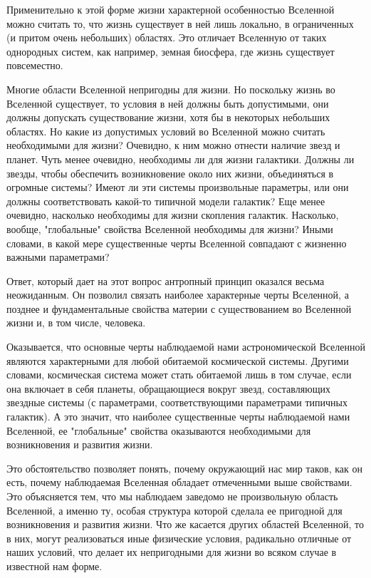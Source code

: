 Применительно к этой форме жизни характерной особенностью Вселенной можно считать то, что жизнь существует в ней лишь локально, в ограниченных (и притом очень небольших) областях. Это отличает Вселенную от таких однородных систем, как например, земная биосфера, где жизнь существует повсеместно.


Многие области Вселенной непригодны для жизни. Но поскольку жизнь во Вселенной существует, то условия в ней должны быть допустимыми, они должны допускать существование жизни, хотя бы в некоторых небольших областях. Но какие из допустимых условий во Вселенной можно считать необходимыми для жизни? Очевидно, к ним можно отнести наличие звезд и планет. Чуть менее очевидно, необходимы ли для жизни галактики. Должны ли звезды, чтобы обеспечить возникновение около них жизни, объединяться в огромные системы? Имеют ли эти системы произвольные параметры, или они должны соответствовать какой-то типичной модели галактик? Еще менее очевидно, насколько необходимы для жизни скопления галактик. Насколько, вообще, "глобальные" свойства Вселенной необходимы для жизни? Иными словами, в какой мере существенные черты Вселенной совпадают с жизненно важными параметрами?


Ответ, который дает на этот вопрос антропный принцип оказался весьма неожиданным. Он позволил связать наиболее характерные черты Вселенной, а позднее и фундаментальные свойства материи с существованием во Вселенной жизни и, в том числе, человека.


Оказывается, что основные черты наблюдаемой нами астрономической Вселенной являются характерными для любой обитаемой космической системы. Другими словами, космическая система может стать обитаемой лишь в том случае, если она включает в себя планеты, обращающиеся вокруг звезд, составляющих звездные системы (с параметрами, соответствующими параметрами типичных галактик). А это значит, что наиболее существенные черты наблюдаемой нами Вселенной, ее "глобальные" свойства оказываются необходимыми для возникновения и развития жизни.


Это обстоятельство позволяет понять, почему окружающий нас мир таков, как он есть, почему наблюдаемая Вселенная обладает отмеченными выше свойствами. Это объясняется тем, что мы наблюдаем заведомо не произвольную область Вселенной, а именно ту, особая структура которой сделала ее пригодной для возникновения и развития жизни. Что же касается других областей Вселенной, то в них, могут реализоваться иные физические условия, радикально отличные от наших условий, что делает их непригодными для жизни во всяком случае в известной нам форме. 


